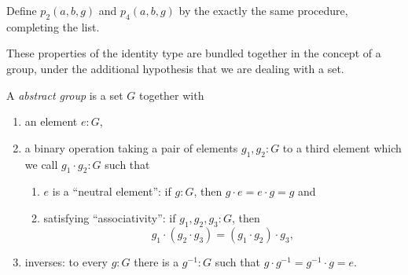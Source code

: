 \begin{xca}
    Define $p_2(a,b,g)$ and $p_4(a,b,g)$ by the exactly the same procedure, completing the list.
\end{xca}


These properties of the identity type are bundled together in the concept of a group, under the additional hypothesis that we are dealing with a set.

  \begin{definition}\label{def:abstractgroup}
    A {\em abstract group} is a set $G$ together with
\begin{enumerate}
\item an element $e:G$, 
\item a binary operation taking a pair of elements $g_1,g_2:G$ to a third element which we call $g_1\cdot g_2:G$ such that
  \begin{enumerate}
  \item $e$ is a ``neutral element'': if $g:G$, then $g\cdot e=e\cdot g=g$ and
  \item satisfying ``associativity'': if $g_1,g_2,g_3:G$, then 
$$g_1\cdot(g_2\cdot g_3)=(g_1\cdot g_2)\cdot g_3,$$
  \end{enumerate}
\item inverses: to every $g:G$ there is a $g^{-1}:G$ such that $g\cdot g^{-1}=g^{-1}\cdot g=e$.
\end{enumerate} 
  \end{definition}

